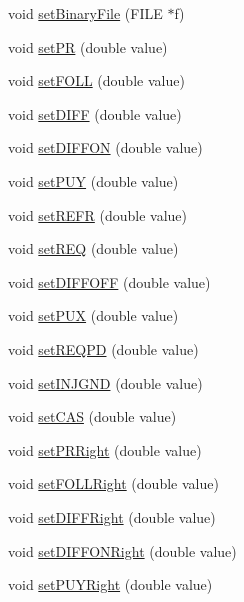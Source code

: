 \begin{DoxyCompactItemize}
void \hyperlink{classdevice2yarp_a1982c1021d9e51c789dfc5369dcb46bf}{set\-Binary\-File} (F\-I\-L\-E $\ast$f)
\item 
void \hyperlink{classdevice2yarp_a88ab89295bfefefbc9ac225dd5078dec}{set\-P\-R} (double value)
\item 
void \hyperlink{classdevice2yarp_a96f85845d4902b017e7d082cbc736735}{set\-F\-O\-L\-L} (double value)
\item 
void \hyperlink{classdevice2yarp_a813be66e7621e575682f44e92efa20ef}{set\-D\-I\-F\-F} (double value)
\item 
void \hyperlink{classdevice2yarp_ac072c8cf5341ae1bb187eacbaf8bc439}{set\-D\-I\-F\-F\-O\-N} (double value)
\item 
void \hyperlink{classdevice2yarp_a263fc557cd4333c9cff0e9e4a3f283cd}{set\-P\-U\-Y} (double value)
\item 
void \hyperlink{classdevice2yarp_a24d972c0905025758a9d25607feaccf3}{set\-R\-E\-F\-R} (double value)
\item 
void \hyperlink{classdevice2yarp_add886f7ed984d3b47788df4cd294f2bc}{set\-R\-E\-Q} (double value)
\item 
void \hyperlink{classdevice2yarp_a202830f7c13eaff007c2594cc5e1d1ba}{set\-D\-I\-F\-F\-O\-F\-F} (double value)
\item 
void \hyperlink{classdevice2yarp_a1e9703e924441f50217aa4ded2be6c57}{set\-P\-U\-X} (double value)
\item 
void \hyperlink{classdevice2yarp_aea2c1f8287d1f9e95ac1ff2dc5ed878b}{set\-R\-E\-Q\-P\-D} (double value)
\item 
void \hyperlink{classdevice2yarp_afaf4e9eba2aa0d2f08602b7a03c6e5bf}{set\-I\-N\-J\-G\-N\-D} (double value)
\item 
void \hyperlink{classdevice2yarp_a469e0006636382fb25380147e146114f}{set\-C\-A\-S} (double value)
\item 
void \hyperlink{classdevice2yarp_a223f809aba867489a6b95c3b1ff66b15}{set\-P\-R\-Right} (double value)
\item 
void \hyperlink{classdevice2yarp_a27c6f1f15ceed7423118303431c9b54c}{set\-F\-O\-L\-L\-Right} (double value)
\item 
void \hyperlink{classdevice2yarp_add9e9df708995e75461d4589aae966c2}{set\-D\-I\-F\-F\-Right} (double value)
\item 
void \hyperlink{classdevice2yarp_aba1778322dffc46348dd78f0b86e56b0}{set\-D\-I\-F\-F\-O\-N\-Right} (double value)
\item 
void \hyperlink{classdevice2yarp_a0e60d43576b2d8f9c26519d09a14a564}{set\-P\-U\-Y\-Right} (double value)

\end{DoxyCompactItemize}
